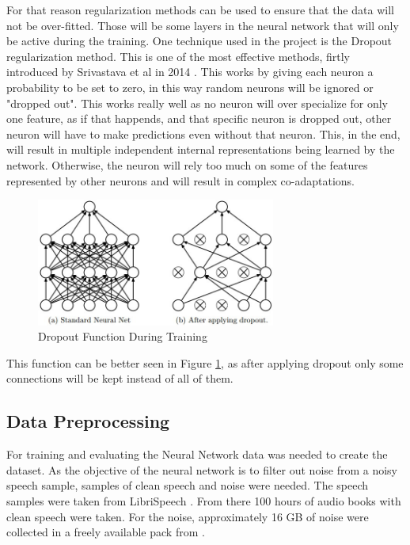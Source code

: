 For that reason regularization methods can be used to ensure that the data will not be over-fitted. Those will be some layers in the neural network that will only be active during the training.
One technique used in the project is the Dropout regularization method. This is one of the most effective methods, firtly introduced by Srivastava et al in 2014 . This works by giving each neuron a probability to be set to zero, in this way random neurons will be ignored or "dropped out". This works really well as no neuron will over specialize for only one feature, as if that happends, and that specific neuron is dropped out, other neuron will have to make predictions even without that neuron. This, in the end, will result in multiple independent internal representations being learned by the network. Otherwise, the neuron will rely too much on some of the features represented by other neurons and will result in complex co-adaptations.


\begin{figure}[htp]
	\centering
	\includegraphics[width=0.7\textwidth]{Illustrations/dropout.jpeg}
	\caption{Dropout Function During Training}
	\label{fig:dropout}
\end{figure}

This function can be better seen in Figure \ref{fig:dropout}, as after applying dropout only some connections will be kept instead of all of them.
\newpage
\subsection{Data Preprocessing}

For training and evaluating the Neural Network data was needed to create the dataset. As the objective of the neural network is to filter out noise from a noisy speech sample, samples of clean speech and noise were needed. The speech samples were taken from LibriSpeech . From there 100 hours of audio books with clean speech were taken.
For the noise, approximately 16 GB of noise were collected in a freely available pack from .

